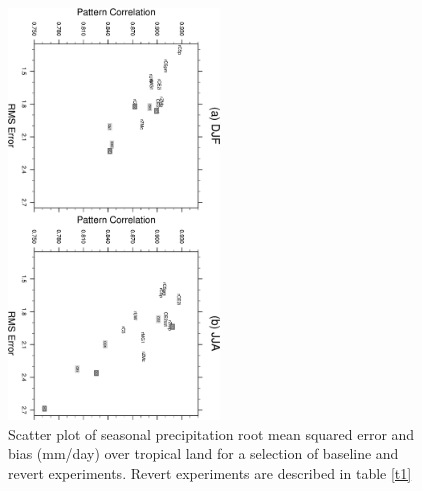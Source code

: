 \clearpage
\begin{figure}[t]
  \begin{center}
    \includegraphics[width=0.5\textwidth,angle=90.]{./figs/f_scatt_tropics_PRECT_land.pdf}
  \end{center}
  \caption{Scatter plot of seasonal precipitation root mean squared error and bias (mm/day) over tropical land for a selection of baseline and revert experiments. Revert experiments are described in table \ref{t1}} 
\label{f_scatt_tropics_PRECT_land}
\end{figure} 




